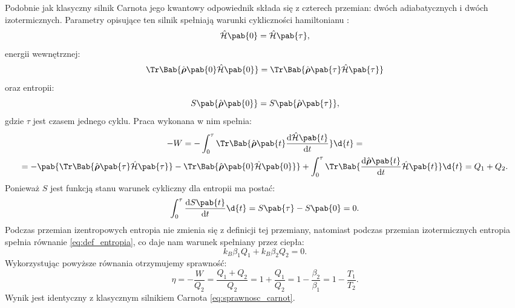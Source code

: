 Podobnie jak klasyczny silnik Carnota jego kwantowy odpowiednik składa się z czterech przemian: dwóch adiabatycznych i dwóch izotermicznych. Parametry opisujące ten silnik spełniają warunki cykliczności hamiltonianu \cite{myers}:
\begin{equation*}
	\ham\pab{0} = \ham\pab{\tau},
\end{equation*}
energii wewnętrznej:
\begin{equation*}
	\Tr\Bab{\vu{\rho}\pab{0} \ham\pab{0}} = \Tr\Bab{\vu{\rho}\pab{\tau} \ham\pab{\tau}}
\end{equation*}
oraz entropii:
\begin{equation*}
	S\pab{\vu{\rho}\pab{0}} = S\pab{\vu{\rho}\pab{\tau}},
\end{equation*}
gdzie \(\tau\) jest czasem jednego cyklu. Praca wykonana w nim spełnia:
\begin{multline*}
	- W = - \int_{0}^{\tau} \Tr\Bab{\vu{\rho}\pab{t} \odv{\ham\pab{t}}{t}} \d{t} = \\ =
	- \pab{\Tr\Bab{\vu{\rho}\pab{\tau} \ham\pab{\tau}} - \Tr\Bab{\vu{\rho}\pab{0} \ham\pab{0}}} + \int_{0}^{\tau} \Tr\Bab{\odv{\vu{\rho}\pab{t}}{t} \ham\pab{t}} \d{t} = Q_1 + Q_2.
\end{multline*}
Ponieważ \(S\) jest funkcją stanu warunek cykliczny dla entropii ma postać:
\begin{equation*}
	\int_{0}^{\tau} \odv{S\pab{t}}{t} \d{t} =
	S\pab{\tau} - S\pab{0} = 0.
\end{equation*}
Podczas przemian izentropowych entropia nie zmienia się z definicji tej przemiany, natomiast podczas przemian izotermicznych entropia spełnia równanie \eqref{eq:def_entropia}, co daje nam warunek spełniany przez ciepła:
\begin{equation}
	k_B \beta_1 Q_1 + k_B \beta_2 Q_2 = 0.
\end{equation}
Wykorzystując powyższe równania otrzymujemy sprawność:
\begin{equation}\label{eq:kwant_sprawnosc_Carnot}
	\eta = - \frac{W}{Q_2} = \frac{Q_1 + Q_2}{Q_2} = 1 + \frac{Q_1}{Q_2} = 1 - \frac{\beta_2}{\beta_1} = 1 - \frac{T_1}{T_2}.
\end{equation}
Wynik jest identyczny z klasycznym silnikiem Carnota \eqref{eq:sprawnosc_carnot}.
